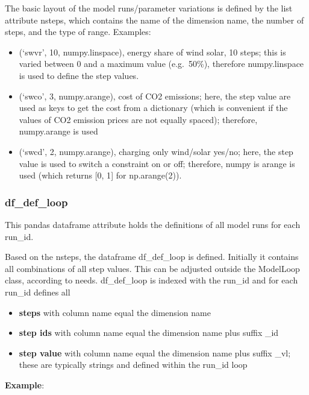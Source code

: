 \documentclass[]{article}
\begin{document}
The basic layout of the model runs/parameter variations is defined by
the list attribute nsteps, which contains the name of the dimension
name, the number of steps, and the type of range. Examples:

\begin{itemize}
\itemsep1pt\parskip0pt
\item
  (`swvr', 10, numpy.linspace), energy share of wind solar, 10 steps;
  this is varied between 0 and a maximum value (e.g.~50\%), therefore
  numpy.linspace is used to define the step values.
\item
  (`swco', 3, numpy.arange), cost of CO2 emissions; here, the step value
  are used as keys to get the cost from a dictionary (which is
  convenient if the values of CO2 emission prices are not equally
  spaced); therefore, numpy.arange is used
\item
  (`swcd', 2, numpy.arange), charging only wind/solar yes/no; here, the
  step value is used to switch a constraint on or off; therefore, numpy
  is arange is used (which returns {[}0, 1{]} for np.arange(2)).
\end{itemize}

\subsubsection{df\_def\_loop}\label{dfux5fdefux5floop}

This pandas dataframe attribute holds the definitions of all model runs
for each run\_id.

Based on the nsteps, the dataframe df\_def\_loop is defined. Initially
it contains all combinations of all step values. This can be adjusted
outside the ModelLoop class, according to needs. df\_def\_loop is
indexed with the run\_id and for each run\_id defines all

\begin{itemize}
\itemsep1pt\parskip0pt
\item
  \textbf{steps} with column name equal the dimension name
\item
  \textbf{step ids} with column name equal the dimension name plus
  suffix \_id
\item
  \textbf{step value} with column name equal the dimension name plus
  suffix \_vl; these are typically strings and defined within the
  run\_id loop
\end{itemize}

\textbf{Example}:
\end{document}
